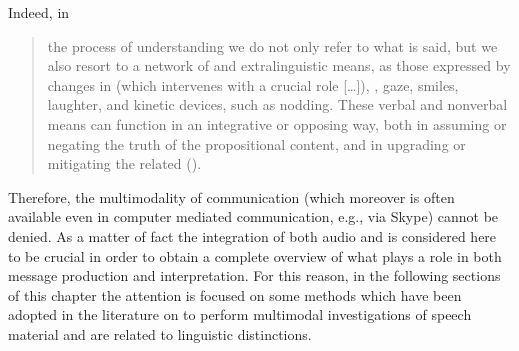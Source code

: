 \documentclass[output=paper]{langsci/langscibook}
\begin{document}
Indeed, in 

\begin{quote}
the process of understanding we do not only refer to what is said, but we also resort to a network of  and extralinguistic means, as those expressed by changes in  (which intervenes with a crucial role […]), , gaze, smiles, laughter, and kinetic devices, such as nodding. These verbal and nonverbal means can function in an integrative or opposing way, both in assuming or negating the truth of the propositional content, and in upgrading or mitigating the related  (\citealt[100]{GiliFivela2014}).
\end{quote}

Therefore, the multimodality of communication (which moreover is often available even in computer mediated communication, e.g., via Skype) cannot be denied. As a matter of fact the integration of both audio and  is considered here to be crucial in order to obtain a complete overview of what plays a role in both message production and interpretation. For this reason, in the following sections of this chapter the attention is focused on some methods which have been adopted in the literature on  to perform multimodal investigations of speech material and are related to linguistic distinctions.\largerpage
\end{document}
